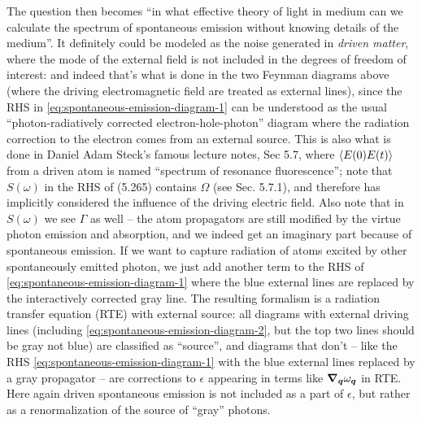 \documentclass[hyperref, a4paper]{article}
\begin{document}
The question then becomes
``in what effective theory of light in medium can we calculate the spectrum of spontaneous emission 
without knowing details of the medium''.
It definitely could be modeled as the noise generated in \emph{driven matter},
where the mode of the external field is not included in the degrees of freedom of interest:
and indeed that's what is done in the two Feynman diagrams above (where the driving electromagnetic field are treated as external lines),
since the RHS in \eqref{eq:spontaneous-emission-diagram-1}
can be understood as the usual ``photon-radiatively corrected electron-hole-photon'' diagram 
where the radiation correction to the electron comes from an external source.
This is also what is done in Daniel Adam Steck's famous lecture notes, Sec 5.7,
where $\expval{E(0) E(t)}$ from a driven atom is named ``spectrum of resonance fluorescence''; 
note that $S(\omega)$ in the RHS of (5.265) contains $\Omega$ 
(see Sec. 5.7.1), 
and therefore has implicitly considered the influence of the driving electric field.
Also note that in $S(\omega)$ we see $\Gamma$ as well -- 
the atom propagators are still modified by the virtue photon emission and absorption, 
and we indeed get an imaginary part because of spontaneous emission.
If we want to capture radiation of atoms excited by other spontaneously emitted photon,
we just add another term to the RHS of \eqref{eq:spontaneous-emission-diagram-1} 
where the blue external lines 
are replaced by the interactively corrected gray line.
The resulting formalism is a radiation transfer equation (RTE) with external source:
all diagrams with external driving lines 
(including \eqref{eq:spontaneous-emission-diagram-2}, 
but the top two lines should be gray not blue)
are classified as ``source'', 
and diagrams that don't -- like the RHS \eqref{eq:spontaneous-emission-diagram-1}
with the blue external lines replaced by a gray propagator -- 
are corrections to $\epsilon$ appearing in terms like $\grad_{\vb*{q}} \omega_{\vb*{q}}$ in RTE.
Here again driven spontaneous emission is not included as a part of $\epsilon$,
but rather as a renormalization of the source of ``gray'' photons.
\end{document}
